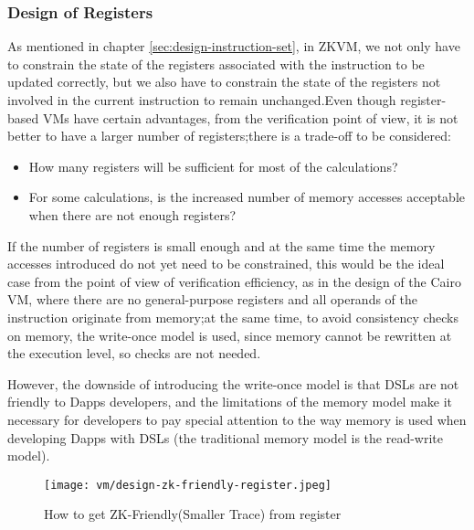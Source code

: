 \subsubsection{Design of Registers} \label{sec:design-registers}

As mentioned in chapter \ref*{sec:design-instruction-set}, in ZKVM, we not only have to constrain the state of the registers associated with
the instruction to be updated correctly, but we also have to constrain the state of the registers not involved in the current
instruction to remain unchanged.Even though register-based VMs have certain advantages, from the verification point of view,
it is not better to have a larger number of registers;there is a trade-off to be considered:

\begin{itemize}
    \item How many registers will be sufficient for most of the calculations?
    \item For some calculations, is the increased number of memory accesses acceptable when there are not enough registers?
\end{itemize}

If the number of registers is small enough and at the same time the memory accesses introduced do not yet need to be constrained,
this would be the ideal case from the point of view of verification efficiency, as in the design of the Cairo VM, where there are
no general-purpose registers and all operands of the instruction originate from memory;at the same time, to avoid consistency checks
on memory, the write-once model is used, since memory cannot be rewritten at the execution level, so checks are not needed.

However, the downside of introducing the write-once model is that DSLs are not friendly to Dapps developers, and the limitations of
the memory model make it necessary for developers to pay special attention to the way memory is used when developing Dapps with DSLs
(the traditional memory model is the read-write model).

\begin{figure}[!ht]
    \centering
    \texttt{[image: vm/design-zk-friendly-register.jpeg]}
    \caption{How to get ZK-Friendly(Smaller Trace) from register}
    \label{fig:design-zk-friendly-register}
\end{figure}


